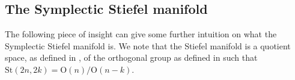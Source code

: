 \subsection{The Symplectic Stiefel manifold}

The following piece of insight can give some further intuition on what the Symplectic Stiefel manifold is. We note that the Stiefel manifold is a quotient space, as defined in , of the orthogonal group as defined in  such that $\mathrm{St}(2n, 2k)=\mathrm{O}(n)/\mathrm{O}(n-k)$. 